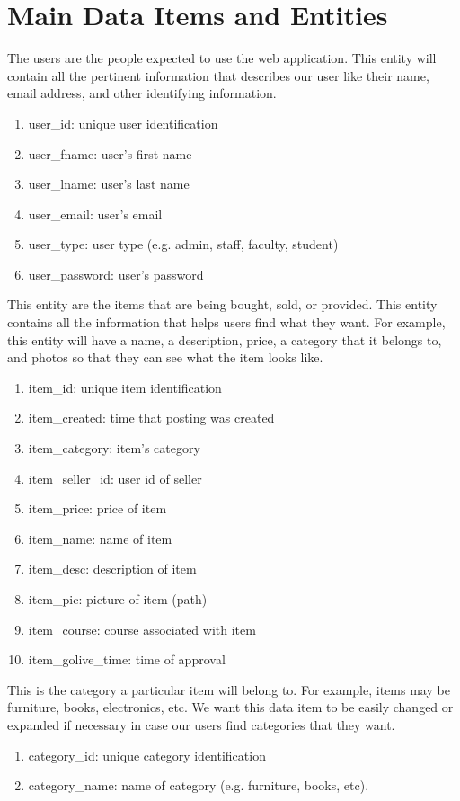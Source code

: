 \section{Main Data Items and Entities}

\begin{description}[font=\bfseries\itshape]

\item[user:] The users are the people expected to use the web application. This entity will contain all the pertinent information that describes our user like their name, email address, and other identifying information.
\begin{enumerate}
\item user\_id: unique user identification
\item user\_fname: user's first name
\item user\_lname: user's last name
\item user\_email: user's email
\item user\_type: user type (e.g. admin, staff, faculty, student)
\item user\_password: user's password
\end{enumerate}
	
\item[item:] This entity are the items that are being bought, sold, or provided.  This entity contains all the information that helps users find what they want.  For example, this entity will have a name, a description, price, a category that it belongs to, and photos so that they can see what the item looks like.
\begin{enumerate}
\item item\_id: unique item identification
\item item\_created: time that posting was created
\item item\_category: item's category
\item item\_seller\_id: user id of seller
\item item\_price: price of item
\item item\_name: name of item
\item item\_desc: description of item
\item item\_pic: picture of item (path)
\item item\_course: course associated with item
\item item\_golive\_time: time of approval 
\end{enumerate}
	
\item[category:] This is the category a particular item will belong to.  For example, items may be furniture, books, electronics, etc.  We want this data item to be easily changed or expanded if necessary in case our users find categories that they want.
\begin{enumerate}
\item category\_id: unique category identification
\item category\_name: name of category (e.g. furniture, books, etc).
\end{enumerate}


\end{description}
